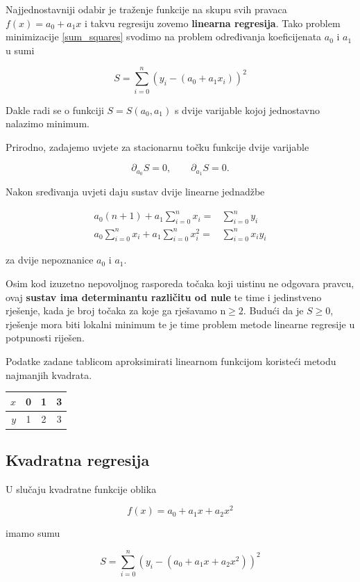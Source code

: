 Najjednostavniji odabir je traženje funkcije na skupu svih pravaca $f(x) = a_0 +
a_1x$ i takvu regresiju zovemo \textbf{linearna regresija}. Tako problem
minimizacije \ref{sum_squares} svodimo na problem određivanja koeficijenata
$a_0$ i $a_1$ u sumi

$$
S = \sum_{i=0}^n(y_i - (a_0+a_1x_i))^2
$$

Dakle radi se o funkciji $S=S(a_0,a_1)$ s dvije varijable kojoj jednostavno
nalazimo minimum.

Prirodno, zadajemo uvjete za stacionarnu točku funkcije dvije varijable

$$
\partial_{a_0}S=0,\qquad\partial_{a_1}S=0.
$$

Nakon sređivanja uvjeti daju sustav dvije linearne jednadžbe

\begin{align*}
a_0(n+1)+a_1\sum_{i=0}^nx_i=&\sum_{i=0}^ny_i\\
a_0\sum_{i=0}^nx_i+a_1\sum_{i=0}^nx_i^2=&\sum_{i=0}^nx_iy_i
\end{align*}

za dvije nepoznanice $a_0$ i $a_1$.

Osim kod izuzetno nepovoljnog rasporeda točaka koji uistinu ne odgovara pravcu,
ovaj \textbf{sustav ima determinantu različitu od nule} te time i jedinstveno
rješenje, kada je broj točaka za koje ga rješavamo n$\geq2$. Budući da je
$S\geq0$, rješenje mora biti lokalni minimum te je time problem metode linearne
regresije u potpunosti riješen.

\begin{example}
    Podatke zadane tablicom aproksimirati linearnom funkcijom koristeći metodu
    najmanjih kvadrata.

    \center
    \begin{tabular}{r|c|c|c}
        $x$ & 0 & 1 & 3 \\
        \hline
        $y$ & 1 & 2 & 3
    \end{tabular}
\end{example}

\subsection{Kvadratna regresija}

U slučaju kvadratne funkcije oblika

$$
f(x) = a_0+a_1x+a_2x^2
$$

imamo sumu

$$
S = \sum_{i=0}^n(y_i - (a_0+a_1x+a_2x^2))^2
$$

